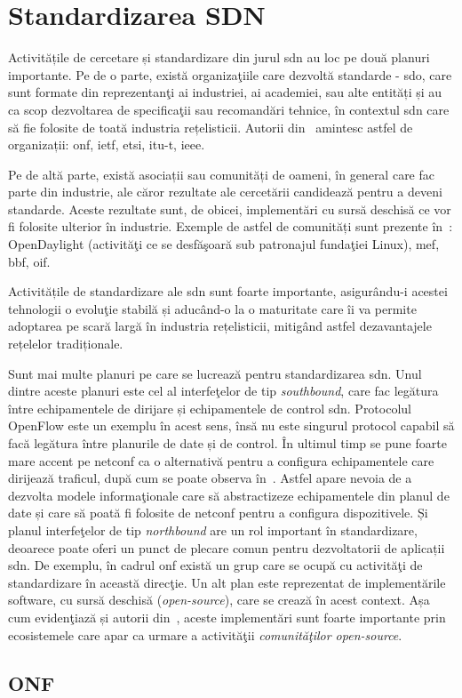 \section{Standardizarea SDN}

Activitățile de cercetare și standardizare din jurul \gls{sdn} au loc pe două planuri importante. Pe de o parte, există organizaţiile care dezvoltă standarde - \gls{sdo}, care sunt formate din reprezentanţi ai industriei, ai academiei, sau alte entități și au ca scop dezvoltarea de specificaţii sau recomandări tehnice, în contextul \gls{sdn} care să fie folosite de toată industria rețelisticii. Autorii din~\cite{schneider2014standardizations} amintesc astfel de organizații: \gls{onf}, \gls{ietf}, \gls{etsi}, \gls{itu-t}, \gls{ieee}. 

Pe de altă parte, există asociații sau comunități de oameni, în general care fac parte din industrie, ale căror rezultate ale cercetării candidează pentru a deveni standarde. Aceste rezultate sunt, de obicei, implementări cu sursă deschisă ce vor fi folosite ulterior în industrie. Exemple de astfel de comunități sunt prezente în~\cite{halpern2014standards, meyer2013software}: OpenDaylight (activităţi ce se desfăşoară sub patronajul fundaţiei Linux), \gls{mef}, \gls{bbf}, \gls{oif}.

Activitățile de standardizare ale \gls{sdn} sunt foarte importante, asigurându-i acestei tehnologii o evoluţie stabilă și aducând-o la o maturitate care îi va permite adoptarea pe scară largă în industria rețelisticii, mitigând astfel dezavantajele rețelelor tradiționale.

Sunt mai multe planuri pe care se lucrează pentru standardizarea \gls{sdn}. Unul dintre aceste planuri este cel al interfeţelor de tip \textit{southbound}, care fac legătura între echipamentele de dirijare și echipamentele de control \gls{sdn}. Protocolul OpenFlow este un exemplu în acest sens, însă nu este singurul protocol capabil să facă legătura între planurile de date și de control. În ultimul timp se pune foarte mare accent pe \gls{netconf} ca o alternativă pentru a configura echipamentele care dirijează traficul, după cum se poate observa în~\cite{csoma2015escape, felix2014multi, zhou2014research}. Astfel apare nevoia de a dezvolta modele informaţionale care să abstractizeze echipamentele din planul de date și care să poată fi folosite de \gls{netconf}
pentru a configura dispozitivele. Și planul interfeţelor de tip \textit{northbound} are un rol important în standardizare, deoarece poate oferi un punct de plecare comun pentru dezvoltatorii de aplicații \gls{sdn}. De exemplu, în cadrul \gls{onf} există un grup care se ocupă cu activităţi de standardizare în această direcţie. Un alt plan este reprezentat de implementările software, cu sursă deschisă (\textit{open-source}), care se crează în acest context. Așa cum evidenţiază și autorii din~\cite{lin2014software, rothenberg2014open}, aceste implementări sunt foarte importante prin ecosistemele care apar ca urmare a activităţii \textit{comunităţilor open-source}.

\subsection{ONF}


